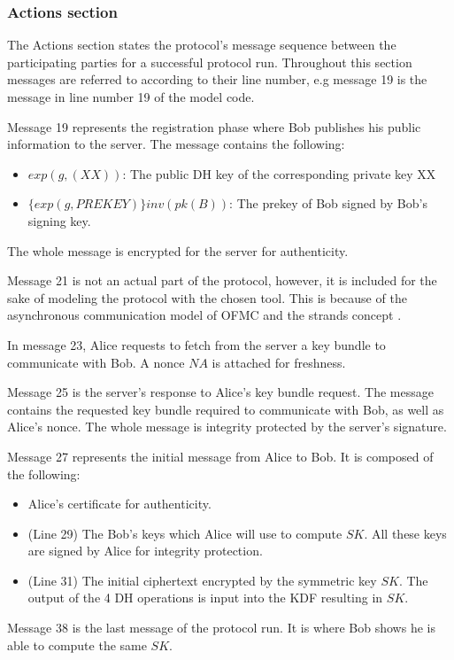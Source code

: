 \subsubsection{Actions section}
The Actions section states the protocol's message sequence between the participating parties for a successful protocol run. Throughout this section messages are referred to according to their line number, e.g message 19 is the message in line number 19 of the model code.
\par
Message 19 represents the registration phase where Bob publishes his public information to the server. The message contains the following:
\begin{itemize}
	\item $exp(g,(XX))$: The public DH key of the corresponding private key XX
	\item $\{exp(g,PREKEY)\}inv(pk(B))$: The prekey of Bob signed by Bob's signing key.
\end{itemize}
The whole message is encrypted for the server for authenticity.
\par
Message 21 is not an actual part of the protocol, however, it is included for the sake of modeling the protocol with the chosen tool. This is because of the asynchronous communication model of OFMC and the strands concept \cite{ofmcTut}.
\par 
In message 23, Alice requests to fetch from the server a key bundle to communicate with Bob. A nonce $NA$ is attached for freshness.
\par
Message 25 is the server's response to Alice's key bundle request. The message contains the requested key bundle required to communicate with Bob, as well as Alice's nonce. The whole message is integrity protected by the server's signature.
\par
Message 27 represents the initial message from Alice to Bob. It is composed of the following:
\begin{itemize}
	\item Alice's certificate for authenticity.
	\item (Line 29) The Bob's keys which Alice will use to compute $SK$. All these keys are signed by Alice for integrity protection.
	\item (Line 31) The initial ciphertext encrypted by the symmetric key $SK$. The output of the 4 DH operations is input into the KDF resulting in $SK$. 
\end{itemize}
\par
Message 38 is the last message of the protocol run. It is where Bob shows he is able to compute the same $SK$. 
